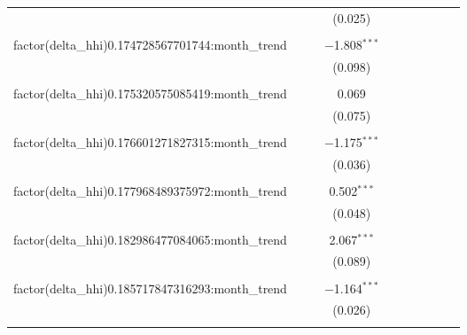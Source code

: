 \begin{table}[H]
{\begin{tabular}{@{\extracolsep{5pt}}lccccccccc}
   &  &  & (0.025) &  &  &  &  &  &  \\  

   & & & & & & & & & \\  

  factor(delta\_hhi)0.174728567701744:month\_trend &  &  & $-$1.808$^{***}$ &  &  &  &  &  &  \\  

   &  &  & (0.098) &  &  &  &  &  &  \\  

   & & & & & & & & & \\  

  factor(delta\_hhi)0.175320575085419:month\_trend &  &  & 0.069 &  &  &  &  &  &  \\  

   &  &  & (0.075) &  &  &  &  &  &  \\  

   & & & & & & & & & \\  

  factor(delta\_hhi)0.176601271827315:month\_trend &  &  & $-$1.175$^{***}$ &  &  &  &  &  &  \\  

   &  &  & (0.036) &  &  &  &  &  &  \\  

   & & & & & & & & & \\  

  factor(delta\_hhi)0.177968489375972:month\_trend &  &  & 0.502$^{***}$ &  &  &  &  &  &  \\  

   &  &  & (0.048) &  &  &  &  &  &  \\  

   & & & & & & & & & \\  

  factor(delta\_hhi)0.182986477084065:month\_trend &  &  & 2.067$^{***}$ &  &  &  &  &  &  \\  

   &  &  & (0.089) &  &  &  &  &  &  \\  

   & & & & & & & & & \\  

  factor(delta\_hhi)0.185717847316293:month\_trend &  &  & $-$1.164$^{***}$ &  &  &  &  &  &  \\  

   &  &  & (0.026) &  &  &  &  &  &  \\  

   & & & & & & & & & \\  


\end{tabular}}
\end{table}
